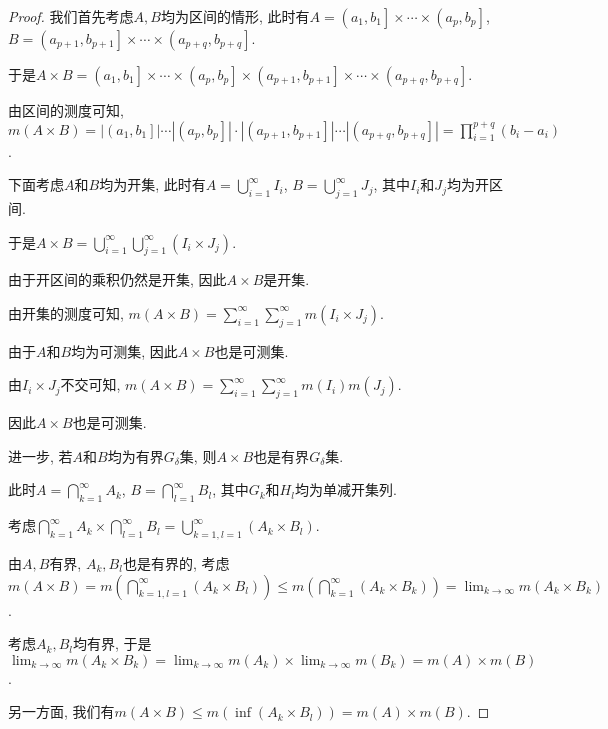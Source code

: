\documentclass[theorem=false,mathfont=none,openany,sub3section]{easybook}
\begin{document}
\begin{proof}
  我们首先考虑$A,B$均为区间的情形, 此时有$A=\left(\right.a_1,b_1\left.\right]\times \cdots \times \left(\right.a_p,b_p\left.\right]$, $B=\left(\right.a_{p+1},b_{p+1}\left.\right]\times \cdots \times \left(\right.a_{p+q},b_{p+q}\left.\right]$.\par
  于是$A\times B=\left(\right.a_1,b_1\left.\right]\times \cdots \times \left(\right.a_p,b_p\left.\right]\times \left(\right.a_{p+1},b_{p+1}\left.\right]\times \cdots \times \left(\right.a_{p+q},b_{p+q}\left.\right]$.\par
  由区间的测度可知, $m(A\times B)=|\left(a_1,b_1\right]| \cdots |\left(a_p,b_p \right]| \cdot |\left(a_{p+1},b_{p+1}\right]| \cdots |\left(a_{p+q},b_{p+q}\right]| = \prod_{i=1}^{p+q}(b_i-a_i)$.\par
  下面考虑$A$和$B$均为开集, 此时有$A=\bigcup_{i=1}^{\infty}I_i$, $B=\bigcup_{j=1}^{\infty}J_j$, 其中$I_i$和$J_j$均为开区间.\par
  于是$A\times B=\bigcup_{i=1}^{\infty}\bigcup_{j=1}^{\infty}(I_i\times J_j)$.\par
  由于开区间的乘积仍然是开集, 因此$A\times B$是开集.\par
  由开集的测度可知, $m(A\times B)=\sum_{i=1}^{\infty}\sum_{j=1}^{\infty}m(I_i\times J_j)$.\par
  由于$A$和$B$均为可测集, 因此$A\times B$也是可测集.\par
  由$I_i\times J_j$不交可知, $m(A\times B)=\sum_{i=1}^{\infty}\sum_{j=1}^{\infty}m(I_i)m(J_j)$.\par
  因此$A\times B$也是可测集.\par
  进一步, 若$A$和$B$均为有界$G_{\delta}$集, 则$A\times B$也是有界$G_{\delta}$集.\par
  此时$A=\bigcap_{k=1}^{\infty}A_k$, $B=\bigcap_{l=1}^{\infty}B_l$, 其中$G_k$和$H_l$均为单减开集列.\par
  考虑$\bigcap_{k=1}^{\infty}A_k \times \bigcap_{l=1}^{\infty}B_l = \bigcup_{k=1,l=1}^{\infty}(A_k \times B_l)$.\par
  由$A, B$有界, $A_k, B_l$也是有界的, 考虑$m(A\times B)=m\left(\bigcap_{k=1,l=1}^{\infty}(A_k\times B_l)\right)\leqslant m\left(\bigcap_{k=1}^{\infty}(A_k\times B_k)\right)=\lim_{k \to \infty}m(A_k \times B_k)$.\par
  考虑$A_k, B_l$均有界, 于是$\lim_{k \to \infty}m(A_k \times B_k)=\lim_{k \to \infty}m(A_k)\times \lim_{k \to \infty}m(B_k)=m(A)\times m(B)$.\par
  另一方面, 我们有$m(A\times B)\leqslant m(\inf (A_k\times B_l))=m(A)\times m(B)$.\par

\end{proof}
\end{document}
